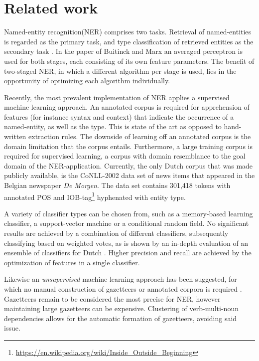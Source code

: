 \section{Related work} \label{sec:rel}
Named-entity recognition(NER) comprises two tasks. Retrieval of named-entities is regarded as the primary task, and type classification of retrieved entities as the secondary task \cite{buitinck2012two}. In the paper of Buitinck and Marx an averaged perceptron is used for both stages, each consisting of its own feature parameters. The benefit of two-staged NER, in which a different algorithm per stage is used, lies in the opportunity of optimizing each algorithm individually.  

Recently, the most prevalent implementation of NER applies a supervised machine learning approach. An annotated corpus is required for apprehension of features (for instance syntax and context) that indicate the occurrence of a named-entity, as well as the type. This is state of the art as opposed to hand-written extraction rules. The downside of learning off an annotated corpus is the domain limitation that the corpus entails. Furthermore, a large training corpus is required for supervised learning, a corpus with domain resemblance to the goal domain of the NER-application. Currently, the only Dutch corpus that was made publicly available, is the CoNLL-2002 data set of news items that appeared in the Belgian newspaper \textit{De Morgen}. The data set contains 301,418 tokens with annotated POS and IOB-tag\footnote{\url{https://en.wikipedia.org/wiki/Inside_Outside_Beginning}} hyphenated with entity type.

A variety of classifier types can be chosen from, such as a memory-based learning classifier, a support-vector machine or a conditional random field.
No significant results are achieved by a combination of different classifiers, subsequently classifying based on weighted votes, as is shown by an in-depth evaluation of an ensemble of classifiers for Dutch  \cite{desmet2014fine}. Higher precision and recall are achieved by the optimization of features in a single classifier. 

Likewise an \textit{unsupervised} machine learning approach has been suggested, for which no manual construction of gazetteers or annotated corpora is required \cite{kazama2008inducing}. Gazetteers remain to be considered the most precise for NER, however maintaining large gazetteers can be expensive. Clustering of verb-multi-noun dependencies allows for the automatic formation of gazetteers, avoiding said issue.

